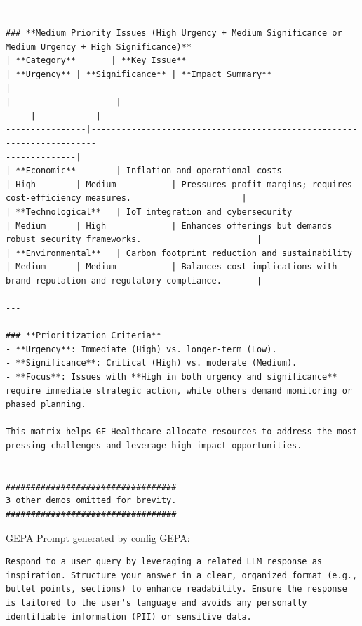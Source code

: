 \begin{instructbox}
\begin{lstlisting}[breakindent=0pt, breaklines=true, breakatwhitespace=true, frame=single, backgroundcolor=\color{green!10}]
---

### **Medium Priority Issues (High Urgency + Medium Significance or Medium Urgency + High Significance)**  
| **Category**       | **Key Issue**                                      | **Urgency** | **Significance** | **Impact Summary**                                                                 |
|---------------------|----------------------------------------------------|------------|--
----------------|-----------------------------------------------------------------------
--------------|
| **Economic**        | Inflation and operational costs                    | High        | Medium           | Pressures profit margins; requires cost-efficiency measures.                      |
| **Technological**   | IoT integration and cybersecurity                  | Medium      | High             | Enhances offerings but demands robust security frameworks.                       |
| **Environmental**   | Carbon footprint reduction and sustainability       | Medium      | Medium           | Balances cost implications with brand reputation and regulatory compliance.       |

---

### **Prioritization Criteria**  
- **Urgency**: Immediate (High) vs. longer-term (Low).  
- **Significance**: Critical (High) vs. moderate (Medium).  
- **Focus**: Issues with **High in both urgency and significance** require immediate strategic action, while others demand monitoring or phased planning.  

This matrix helps GE Healthcare allocate resources to address the most pressing challenges and leverage high-impact opportunities.


##################################
3 other demos omitted for brevity.
##################################

\end{lstlisting}

GEPA Prompt generated by config GEPA:
\begin{lstlisting}[breakindent=0pt, breaklines=true, breakatwhitespace=true, frame=single, backgroundcolor=\color{blue!10}]
Respond to a user query by leveraging a related LLM response as inspiration. Structure your answer in a clear, organized format (e.g., bullet points, sections) to enhance readability. Ensure the response is tailored to the user's language and avoids any personally identifiable information (PII) or sensitive data.  


\end{lstlisting}
\end{instructbox}
